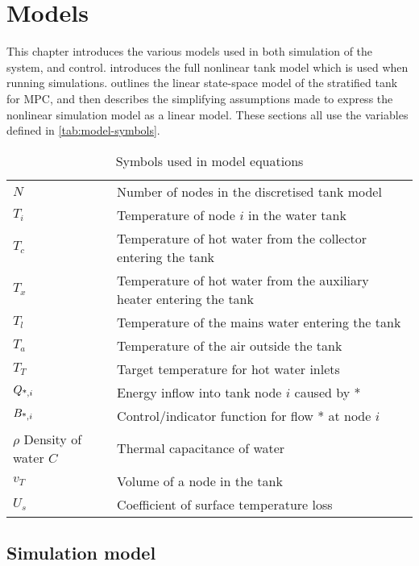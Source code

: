 \chapter{Models}
\label{ch:models}

This chapter introduces the various models used in both simulation of the system, and control.
 introduces the full nonlinear tank model which is used when running simulations.
 outlines the linear state-space model of the stratified tank for MPC, and then describes the simplifying assumptions made to express the nonlinear simulation model as a linear model.
These sections all use the variables defined in \autoref{tab:model-symbols}.

\begin{table}
   \caption{Symbols used in model equations}
   \label{tab:model-symbols}
   \begin{center}
   \begin{tabular}{l l}
      \toprule
      $N$ & Number of nodes in the discretised tank model \\
      $T_i$ & Temperature of node $i$ in the water tank \\
      $T_c$ & Temperature of hot water from the collector entering the tank \\
      $T_x$ & Temperature of hot water from the auxiliary heater entering the tank \\
      $T_l$ & Temperature of the mains water entering the tank \\
      $T_a$ & Temperature of the air outside the tank \\
      $T_T$ & Target temperature for hot water inlets \\
      $Q_{\text{*}, i}$ & Energy inflow into tank node $i$ caused by * \\
      $B_{\text{*}, i}$ & Control/indicator function for flow * at node $i$ \\
      $\rho$ Density of water
      $C$ & Thermal capacitance of water \\
      $v_T$ & Volume of a node in the tank \\
      $U_s$ & Coefficient of surface temperature loss \\
      \bottomrule
   \end{tabular}
   \end{center}
\end{table}

\section{Simulation model}
\label{sec:models:simulation}

